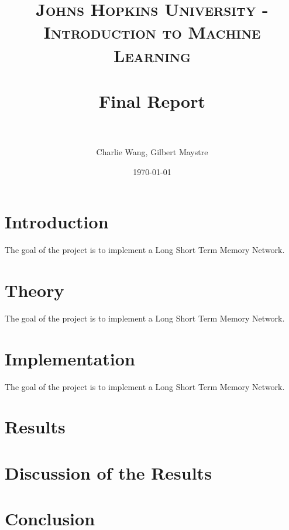\documentclass[paper=A4, fontsize=11pt]{scrartcl} %
\title{	
\normalfont \normalsize 
\textsc{Johns Hopkins University - Introduction to Machine Learning} \\ [25pt] %
\horrule{0.5pt} \\[0.4cm] %
\huge Final Report \\ %
\horrule{2pt} \\[0.5cm] %
}
\author{Charlie Wang, Gilbert Maystre} %
\date{\normalsize\today} %
\begin{document}
\maketitle %
\newpage

\section{Introduction}
The goal of the project is to implement a Long Short Term Memory Network.
\newpage

\section{Theory}
The goal of the project is to implement a Long Short Term Memory Network.
\newpage


\section{Implementation}
The goal of the project is to implement a Long Short Term Memory Network.
\newpage


\section{Results}

\newpage


\section{Discussion of the Results}

\newpage


\section{Conclusion}
\end{document}
